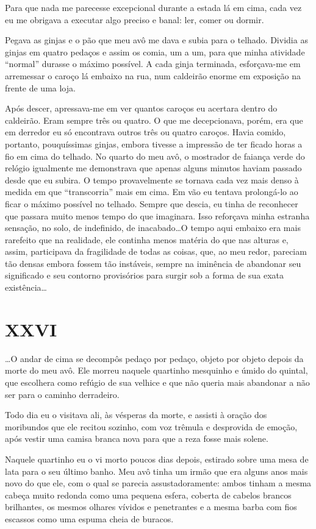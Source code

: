 Para que nada me parecesse excepcional durante a estada lá em cima, cada vez eu me obrigava a executar algo preciso e banal: ler, comer ou dormir.

Pegava as ginjas e o pão que meu avô me dava e subia para o telhado. Dividia as ginjas em quatro pedaços e assim os comia, um a um, para que minha atividade ``normal'' durasse o máximo possível. A cada ginja terminada, esforçava-me em arremessar o caroço lá embaixo na rua, num caldeirão enorme em exposição na frente de uma loja.

Após descer, apressava-me em ver quantos caroços eu acertara dentro do caldeirão. Eram sempre três ou quatro. O que me decepcionava, porém, era que em derredor eu só encontrava outros três ou quatro caroços. Havia comido, portanto, pouquíssimas ginjas, embora tivesse a impressão de ter ficado horas a fio em cima do telhado. No quarto do meu avô, o mostrador de faiança verde do relógio igualmente me demonstrava que apenas alguns minutos haviam passado desde que eu subira. O tempo provavelmente se tornava cada vez mais denso à medida em que ``transcorria'' mais em cima. Em vão eu tentava prolongá-lo ao ficar o máximo possível no telhado. Sempre que descia, eu tinha de reconhecer que passara muito menos tempo do que imaginara. Isso reforçava minha estranha sensação, no solo, de indefinido, de inacabado\dots O tempo aqui embaixo era mais rarefeito que na realidade, ele continha menos matéria do que nas alturas e, assim, participava da fragilidade de todas as coisas, que, ao meu redor, pareciam tão densas embora fossem tão instáveis, sempre na iminência de abandonar seu significado e seu contorno provisórios para surgir sob a forma de sua exata existência\dots


\chapter*{\centering\Large{XXVI}}

\dots O andar de cima se decompôs pedaço por pedaço, objeto por objeto depois da morte do meu avô. Ele morreu naquele quartinho mesquinho e úmido do quintal, que escolhera como refúgio de sua velhice e que não queria mais abandonar a não ser para o caminho derradeiro.

Todo dia eu o visitava ali, às vésperas da morte, e assisti à oração dos moribundos que ele recitou sozinho, com voz trêmula e desprovida de emoção, após vestir uma camisa branca nova para que a reza fosse mais solene.

Naquele quartinho eu o vi morto poucos dias depois, estirado sobre uma mesa de lata para o seu último banho. Meu avô tinha um irmão que era alguns anos mais novo do que ele, com o qual se parecia assustadoramente: ambos tinham a mesma cabeça muito redonda como uma pequena esfera, coberta de cabelos brancos brilhantes, os mesmos olhares vívidos e penetrantes e a mesma barba com fios escassos como uma espuma cheia de buracos.

